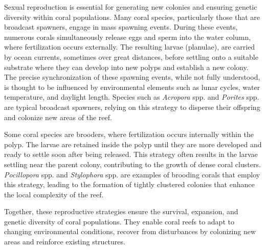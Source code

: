 Sexual reproduction is essential for generating new colonies and ensuring genetic diversity within coral populations. Many coral species, particularly those that are broadcast spawners, engage in mass spawning events. During these events, numerous corals simultaneously release eggs and sperm into the water column, where fertilization occurs externally. The resulting larvae (planulae), are carried by ocean currents, sometimes over great distances, before settling onto a suitable substrate where they can develop into new polyps and establish a new colony. The precise synchronization of these spawning events, while not fully understood, is thought to be influenced by environmental elements such as lunar cycles, water temperature, and daylight length. Species such as \textit{Acropora} spp. and \textit{Porites} spp. are typical broadcast spawners, relying on this strategy to disperse their offspring and colonize new areas of the reef.

Some coral species are brooders, where fertilization occurs internally within the polyp. The larvae are retained inside the polyp until they are more developed and ready to settle soon after being released. This strategy often results in the larvae settling near the parent colony, contributing to the growth of dense coral clusters. \textit{Pocillopora} spp. and \textit{Stylophora} spp. are examples of brooding corals that employ this strategy, leading to the formation of tightly clustered colonies that enhance the local complexity of the reef.

Together, these reproductive strategies ensure the survival, expansion, and genetic diversity of coral populations. They enable coral reefs to adapt to changing environmental conditions, recover from disturbances by colonizing new areas and reinforce existing structures.



